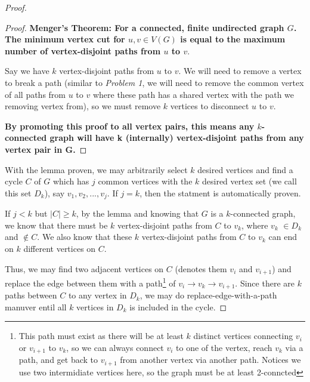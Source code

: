 \documentclass[11pt]{article}
\begin{document}
\begin{proof}

\leavevmode\newline


    \begin{adjustwidth}{1cm}{}

    \begin{proof}
    \textbf{Menger's Theorem: For a connected, finite undirected graph $G$. The minimum vertex cut for $u, v \in V(G)$ is equal to the maximum number of vertex-disjoint paths from $u$ to $v$}.\newline

    Say we have $k$ vertex-disjoint paths from $u$ to $v$. We will need to remove a vertex to break a path (similar to \textit{Problem 1}, we will need to remove the common vertex of all paths from $u$ to $v$ where these path has a shared vertex with the path we removing vertex from), so we must remove $k$ vertices to disconnect $u$ to $v$.

    \textbf{By promoting this proof to all vertex pairs, this means any $k$-connected graph will have k (internally) vertex-disjoint paths from any vertex pair in G.}


    \end{proof}

    \end{adjustwidth}

With the lemma proven, we may arbitrarily select $k$ desired vertices and find a cycle $C$ of $G$ which has $j$ common vertices with the $k$ desired vertex set (we call this set $D_k$), say $v_1, v_2, ..., v_j$. If $j = k$, then the statment is automatically proven. \newline

If $j < k$ but $|C| \geq k$, by the lemma and knowing that $G$ is a $k$-connected graph, we know that there must be $k$ vertex-disjoint paths from $C$ to $v_k$, where $v_k$ $\in D_k$ and $\not \in C$. We also know that these $k$ vertex-disjoint paths from $C$ to $v_k$ can end on $k$ different vertices on $C$.

Thus, we may find two adjacent vertices on $C$ (denotes them $v_i$ and $v_{i+1}$) and replace the edge between them with a path\footnote{This path must exist as there will be at least $k$ distinct vertices connecting $v_{i}$ or $v_{i+1}$ to $v_k$, so we can always connect $v_i$ to one of the vertex, reach $v_k$ via a path, and get back to $v_{i+1}$ from another vertex via another path. Notices we use two intermidiate vertices here, so the graph must be at least 2-conncted} of $v_{i} \to v_k \to v_{i+1}$. Since there are $k$ paths between $C$ to any vertex in $D_k$, we may do replace-edge-with-a-path manuver entil all $k$ vertices in $D_k$ is included in the cycle.


\end{proof}
\end{document}
